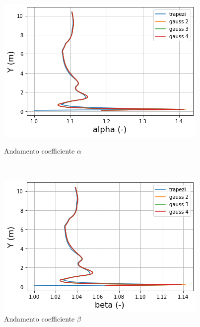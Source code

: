 \documentclass[12pt]{article} %
\begin{document}
\begin{figure}[H]
\begin{minipage}[b]{8.5cm}
\centering
    \includegraphics[width=1 \textwidth]{alphaadi.png}
    \caption{Andamento coefficiente $\alpha$}
    \label{fig:Adige_alfa}
\end{minipage}
\ \hspace{2mm} \hspace{3mm} \
\begin{minipage}[b]{8.5cm}
    \centering
    \includegraphics[width=1 \textwidth]{betaadi.png}
    \caption{Andamento coefficiente $\beta$}
    \label{fig:Adige_beta}
\end{minipage}
\end{figure}
\end{document}
